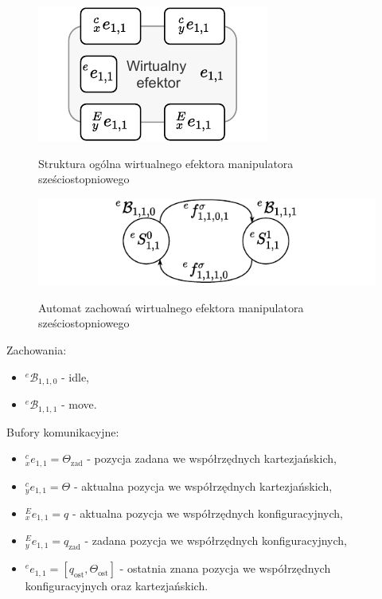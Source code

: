 \begin{figure}
    \centering
    \includegraphics[width=0.75\columnwidth]{figures/ISR-ve-manip-model.pdf}
    \label{fig:model-ve-manip}
    \caption{Struktura ogólna wirtualnego efektora manipulatora sześciostopniowego}
\end{figure}

\begin{figure}
    \centering
    \includegraphics[width=\columnwidth]{figures/ISR-ve-manip-behaviours.pdf}
    \label{fig:zachowania-ve-manip}
    \caption{Automat zachowań wirtualnego efektora manipulatora sześciostopniowego}
\end{figure}

Zachowania:
\begin{itemize}
    \item ${}^{e}\mathcal{B}_{1,1,0}$ - idle,
    \item ${}^{e}\mathcal{B}_{1,1,1}$ - move.
\end{itemize}

Bufory komunikacyjne:
\begin{itemize}
    \item ${}^{c}_{x}e_{1,1} = \Theta_{\mathrm{zad}}$ - pozycja zadana we współrzędnych kartezjańskich,
    \item ${}^{c}_{y}e_{1,1} = \Theta$ - aktualna pozycja we współrzędnych kartezjańskich,
    \item ${}^{E}_{x}e_{1,1} = q$ - aktualna pozycja we współrzędnych konfiguracyjnych,
    \item ${}^{E}_{y}e_{1,1} = q_{\mathrm{zad}}$ - zadana pozycja we współrzędnych konfiguracyjnych,
    \item ${}^{e}e_{1,1} = [q_{\mathrm{ost}}, \Theta_{\mathrm{ost}}]$ - ostatnia znana pozycja we współrzędnych konfiguracyjnych oraz kartezjańskich.
\end{itemize}

